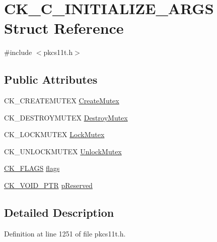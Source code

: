 \hypertarget{struct_c_k___c___i_n_i_t_i_a_l_i_z_e___a_r_g_s}{}\section{C\+K\+\_\+\+C\+\_\+\+I\+N\+I\+T\+I\+A\+L\+I\+Z\+E\+\_\+\+A\+R\+GS Struct Reference}
\label{struct_c_k___c___i_n_i_t_i_a_l_i_z_e___a_r_g_s}


{\ttfamily \#include $<$pkcs11t.\+h$>$}

\subsection*{Public Attributes}
\begin{DoxyCompactItemize}
\item 
C\+K\+\_\+\+C\+R\+E\+A\+T\+E\+M\+U\+T\+EX \hyperlink{struct_c_k___c___i_n_i_t_i_a_l_i_z_e___a_r_g_s_ae4a461121c37163cb153f17f1b4598de}{Create\+Mutex}
\item 
C\+K\+\_\+\+D\+E\+S\+T\+R\+O\+Y\+M\+U\+T\+EX \hyperlink{struct_c_k___c___i_n_i_t_i_a_l_i_z_e___a_r_g_s_a9b5ebf676f4a6c9306b68567f89a4efd}{Destroy\+Mutex}
\item 
C\+K\+\_\+\+L\+O\+C\+K\+M\+U\+T\+EX \hyperlink{struct_c_k___c___i_n_i_t_i_a_l_i_z_e___a_r_g_s_acb3c3965f4190053337b9195e88f0d0c}{Lock\+Mutex}
\item 
C\+K\+\_\+\+U\+N\+L\+O\+C\+K\+M\+U\+T\+EX \hyperlink{struct_c_k___c___i_n_i_t_i_a_l_i_z_e___a_r_g_s_a39405e53ae004b728c1f17d462c1bea5}{Unlock\+Mutex}
\item 
\hyperlink{pkcs11t_8h_a53850492c1ba57aca4332be791a3c6a3}{C\+K\+\_\+\+F\+L\+A\+GS} \hyperlink{struct_c_k___c___i_n_i_t_i_a_l_i_z_e___a_r_g_s_a8fd53ac76a9bc361f4fb2127b74cfc16}{flags}
\item 
\hyperlink{pkcs11t_8h_ace49359127edfc5665608140005b9a96}{C\+K\+\_\+\+V\+O\+I\+D\+\_\+\+P\+TR} \hyperlink{struct_c_k___c___i_n_i_t_i_a_l_i_z_e___a_r_g_s_a7c88d9ed84cd898ea906f20d096689a8}{p\+Reserved}
\end{DoxyCompactItemize}


\subsection{Detailed Description}


Definition at line 1251 of file pkcs11t.\+h.



